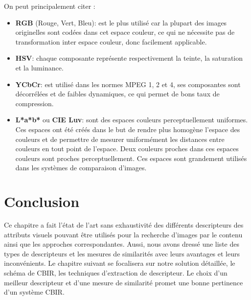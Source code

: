 On peut principalement citer :
\begin{itemize}
	\item \textbf{RGB} (Rouge, Vert, Bleu): est le plus utilisé car la plupart des images originelles sont codées dans cet espace couleur, ce qui ne nécessite pas de transformation inter
	espace couleur, donc facilement applicable.
	
	\item \textbf{HSV}: chaque composante représente respectivement la teinte, la saturation et la luminance.
	
	\item \textbf{YCbCr}: est utilisé dans les normes MPEG 1, 2 et 4, ses composantes sont décorrélées et de faibles dynamiques, ce qui permet de bons taux de compression.
	
	\item \textbf{L*a*b*} ou \textbf{CIE Luv}: sont des espaces couleurs perceptuellement uniformes. Ces espaces ont été créés dans le but de rendre plus homogène l’espace des couleurs et de
	permettre de mesurer uniformément les distances entre couleurs en tout point de l'espace. Deux couleurs proches dans ces espaces couleurs sont proches perceptuellement. Ces espaces sont grandement utilisés dans les systèmes de comparaison d'images.
\end{itemize}


\section{Conclusion}
Ce chapitre a fait l’état de l’art sans exhaustivité des différents descripteurs des attributs
visuels pouvant être utilisés pour la recherche d’images par le contenu ainsi que les approches
correspondantes. Aussi, nous avons dressé une liste des types de descripteurs et les mesures
de similarités avec leurs avantages et leurs inconvénients. Le chapitre suivant se focalisera sur
notre solution détaillée, le schéma de CBIR, les techniques d’extraction de descripteur. Le
choix d’un meilleur descripteur et d’une mesure de similarité promet une bonne pertinence
d’un système CBIR.